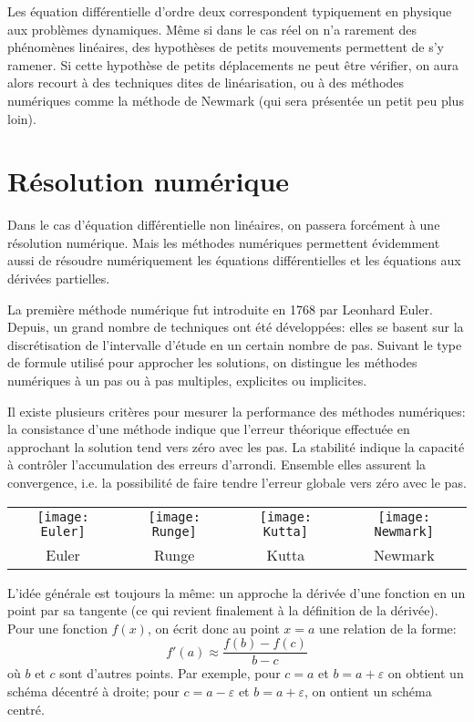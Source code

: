 Les équation différentielle d'ordre deux correspondent typiquement en physique aux problèmes dynamiques. Même si dans le cas réel on n'a rarement des phénomènes linéaires, des hypothèses de petits mouvements permettent de s'y ramener. Si cette hypothèse de petits déplacements ne peut être vérifier, on aura alors recourt à des techniques dites de linéarisation, ou à des méthodes numériques comme la méthode de Newmark (qui sera présentée un petit peu plus loin).
 
\section{Résolution numérique} 
Dans le cas d'équation différentielle non linéaires, on passera forcément à une résolution numérique. Mais les méthodes numériques permettent évidemment aussi de résoudre numériquement les équations différentielles et les équations aux dérivées partielles.
\begin{histoire}
La première méthode numérique fut introduite en 1768 par Leonhard Euler. Depuis, un grand nombre de techniques ont été développées: elles se basent sur la discrétisation de l'intervalle d'étude en un certain nombre de pas. Suivant le type de formule utilisé pour approcher les solutions, on distingue les méthodes numériques à un pas ou à pas multiples, explicites ou implicites. 

Il existe plusieurs critères pour mesurer la performance des méthodes numériques: la consistance d'une méthode indique que l'erreur théorique effectuée en approchant la solution tend vers zéro avec les pas. La stabilité indique la capacité à contrôler l'accumulation des erreurs d'arrondi. Ensemble elles assurent la convergence, i.e. la possibilité de faire tendre l'erreur globale vers zéro avec le pas.\\[5pt]

\footnotesize\setlength\tabcolsep{0pt}
\begin{tabular}{cccc} 
\texttt{[image: Euler]}& 
\texttt{[image: Runge]}& 
\texttt{[image: Kutta]}& 
\texttt{[image: Newmark]}\\ 
Euler & 
Runge& 
Kutta& 
Newmark %
\end{tabular}
\end{histoire}
L'idée générale est toujours la même: un approche la dérivée d'une fonction en un point par sa tangente (ce qui revient finalement à la définition de la dérivée). Pour une fonction $f(x)$, on écrit donc au point $x=a$ une relation de la forme:
\begin{equation}
f'(a)\approx \frac{f(b)-f(c)}{b-c}
\end{equation}
où $b$ et $c$ sont d'autres points. Par exemple, pour $c=a$ et $b=a+\varepsilon$ on obtient un schéma décentré à droite; pour $c=a-\varepsilon$ et $b=a+\varepsilon$, on ontient un schéma centré.
 
